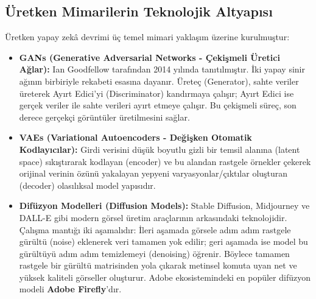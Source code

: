 \documentclass[11pt,a4paper,openany]{book}
\begin{document}
\needspace{9cm}
\subsection{Üretken Mimarilerin Teknolojik Altyapısı}
Üretken yapay zekâ devrimi üç temel mimari yaklaşım üzerine kurulmuştur:
\begin{itemize}
    \item \textbf{GANs (Generative Adversarial Networks - Çekişmeli Üretici Ağlar):} Ian Goodfellow tarafından 2014 yılında tanıtılmıştır. İki yapay sinir ağının birbiriyle rekabeti esasına dayanır. Üreteç (Generator), sahte veriler üreterek Ayırt Edici'yi (Discriminator) kandırmaya çalışır; Ayırt Edici ise gerçek veriler ile sahte verileri ayırt etmeye çalışır. Bu çekişmeli süreç, son derece gerçekçi görüntüler üretilmesini sağlar.
    \item \textbf{VAEs (Variational Autoencoders - Değişken Otomatik Kodlayıcılar):} Girdi verisini düşük boyutlu gizli bir temsil alanına (latent space) sıkıştırarak kodlayan (encoder) ve bu alandan rastgele örnekler çekerek orijinal verinin özünü yakalayan yepyeni varyasyonlar/çıktılar oluşturan (decoder) olasılıksal model yapısıdır.
    \item \textbf{Difüzyon Modelleri (Diffusion Models):} Stable Diffusion, Midjourney ve DALL-E gibi modern görsel üretim araçlarının arkasındaki teknolojidir. Çalışma mantığı iki aşamalıdır: İleri aşamada görsele adım adım rastgele gürültü (noise) eklenerek veri tamamen yok edilir; geri aşamada ise model bu gürültüyü adım adım temizlemeyi (denoising) öğrenir. Böylece tamamen rastgele bir gürültü matrisinden yola çıkarak metinsel komuta uyan net ve yüksek kaliteli görseller oluşturur. Adobe ekosistemindeki en popüler difüzyon modeli \textbf{Adobe Firefly}'dır.
\end{itemize}

\needspace{9cm}
\end{document}
